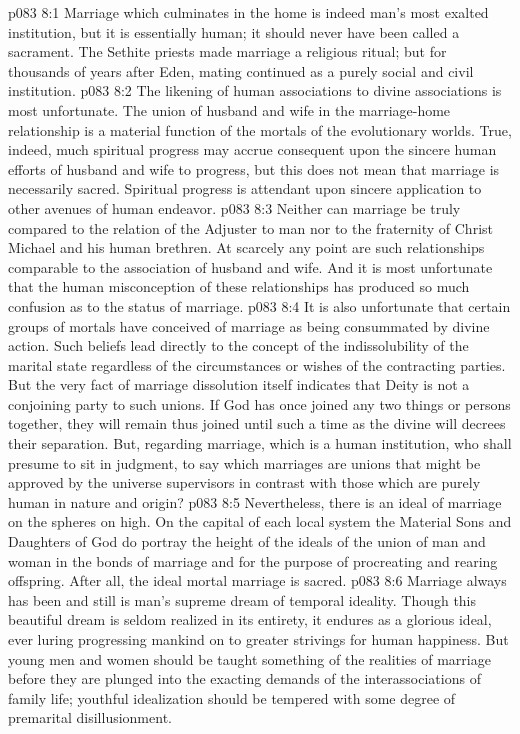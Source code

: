 \vs p083 8:1 Marriage which culminates in the home is indeed man’s most exalted institution, but it is essentially human; it should never have been called a sacrament. The Sethite priests made marriage a religious ritual; but for thousands of years after Eden, mating continued as a purely social and civil institution.
\vs p083 8:2 The likening of human associations to divine associations is most unfortunate. The union of husband and wife in the marriage\hyp{}home relationship is a material function of the mortals of the evolutionary worlds. True, indeed, much spiritual progress may accrue consequent upon the sincere human efforts of husband and wife to progress, but this does not mean that marriage is necessarily sacred. Spiritual progress is attendant upon sincere application to other avenues of human endeavor.
\vs p083 8:3 Neither can marriage be truly compared to the relation of the Adjuster to man nor to the fraternity of Christ Michael and his human brethren. At scarcely any point are such relationships comparable to the association of husband and wife. And it is most unfortunate that the human misconception of these relationships has produced so much confusion as to the status of marriage.
\vs p083 8:4 It is also unfortunate that certain groups of mortals have conceived of marriage as being consummated by divine action. Such beliefs lead directly to the concept of the indissolubility of the marital state regardless of the circumstances or wishes of the contracting parties. But the very fact of marriage dissolution itself indicates that Deity is not a conjoining party to such unions. If God has once joined any two things or persons together, they will remain thus joined until such a time as the divine will decrees their separation. But, regarding marriage, which is a human institution, who shall presume to sit in judgment, to say which marriages are unions that might be approved by the universe supervisors in contrast with those which are purely human in nature and origin?
\vs p083 8:5 Nevertheless, there is an ideal of marriage on the spheres on high. On the capital of each local system the Material Sons and Daughters of God do portray the height of the ideals of the union of man and woman in the bonds of marriage and for the purpose of procreating and rearing offspring. After all, the ideal mortal marriage is  sacred.
\pc \vs p083 8:6 Marriage always has been and still is man’s supreme dream of temporal ideality. Though this beautiful dream is seldom realized in its entirety, it endures as a glorious ideal, ever luring progressing mankind on to greater strivings for human happiness. But young men and women should be taught something of the realities of marriage before they are plunged into the exacting demands of the interassociations of family life; youthful idealization should be tempered with some degree of premarital disillusionment.

